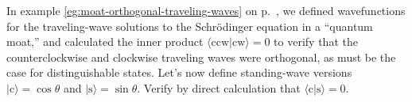 In example \ref{eg:moat-orthogonal-traveling-waves} on p.~\pageref{eg:moat-orthogonal-traveling-waves},
we defined wavefunctions for the traveling-wave solutions to the Schr\"odinger equation
in a ``quantum moat,'' and calculated the inner product
$\langle \text{ccw} | \text{cw} \rangle=0$ to verify that the counterclockwise and clockwise
traveling waves were orthogonal, as must be the case for distinguishable states.
Let's now define standing-wave versions $|\text{c}\rangle = \cos\theta$
and $|\text{s}\rangle = \sin\theta$. Verify by direct calculation that 
$\langle \text{c} | \text{s} \rangle=0$.
